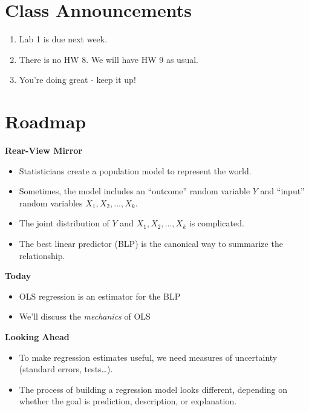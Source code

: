 \documentclass[
]{book}
\providecommand{\tightlist}{%
  \setlength{\itemsep}{0pt}\setlength{\parskip}{0pt}}
\theoremstyle{definition}
\theoremstyle{definition}
\theoremstyle{definition}
\theoremstyle{definition}
\theoremstyle{remark}
\begin{document}
\hypertarget{class-announcements-6}{%
\section{Class Announcements}\label{class-announcements-6}}

\begin{enumerate}
\def\labelenumi{\arabic{enumi}.}
\tightlist
\item
  Lab 1 is due next week.
\item
  There is no HW 8. We will have HW 9 as usual.
\item
  You're doing great - keep it up!
\end{enumerate}

\hypertarget{roadmap-4}{%
\section{Roadmap}\label{roadmap-4}}

\textbf{Rear-View Mirror}

\begin{itemize}
\tightlist
\item
  Statisticians create a population model to represent the world.
\item
  Sometimes, the model includes an ``outcome'' random variable \(Y\) and ``input'' random variables \(X_1, X_2,...,X_k\).
\item
  The joint distribution of \(Y\) and \(X_1, X_2,...,X_k\) is complicated.
\item
  The best linear predictor (BLP) is the canonical way to summarize the relationship.
\end{itemize}

\textbf{Today}

\begin{itemize}
\tightlist
\item
  OLS regression is an estimator for the BLP
\item
  We'll discuss the \emph{mechanics} of OLS
\end{itemize}

\textbf{Looking Ahead}

\begin{itemize}
\tightlist
\item
  To make regression estimates useful, we need measures of uncertainty (standard errors, tests\ldots).
\item
  The process of building a regression model looks different, depending on whether the goal is prediction, description, or explanation.
\end{itemize}
\end{document}
